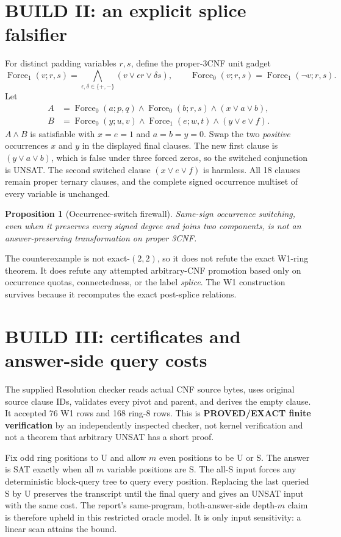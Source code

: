 \documentclass[11pt]{article}
\newtheorem{proposition}[theorem]{Proposition}
\begin{document}
\section{BUILD II: an explicit splice falsifier}
For distinct padding variables $r,s$, define the proper-3CNF unit gadget
\[
 \operatorname{Force}_1(v;r,s)=
 \bigwedge_{\epsilon,\delta\in\{+,-\}}
 (v\vee \epsilon r\vee\delta s),
 \qquad
 \operatorname{Force}_0(v;r,s)=
 \operatorname{Force}_1(\neg v;r,s).
\]
Let
\begin{align*}
 A&=\operatorname{Force}_0(a;p,q)\wedge
    \operatorname{Force}_0(b;r,s)\wedge(x\vee a\vee b),\\
 B&=\operatorname{Force}_0(y;u,v)\wedge
    \operatorname{Force}_1(e;w,t)\wedge(y\vee e\vee f).
\end{align*}
$A\wedge B$ is satisfiable with $x=e=1$ and $a=b=y=0$. Swap the two
\emph{positive} occurrences $x$ and $y$ in the displayed final clauses. The
new first clause is $(y\vee a\vee b)$, which is false under three forced
zeros, so the switched conjunction is UNSAT. The second switched clause
$(x\vee e\vee f)$ is harmless. All 18 clauses remain proper ternary
clauses, and the complete signed occurrence multiset of every variable is
unchanged.
\begin{proposition}[Occurrence-switch firewall]
Same-sign occurrence switching, even when it preserves every signed degree
and joins two components, is not an answer-preserving transformation on
proper 3CNF.
\end{proposition}
The counterexample is not exact-$(2,2)$, so it does not refute the exact
W1-ring theorem. It does refute any attempted arbitrary-CNF promotion based
only on occurrence quotas, connectedness, or the label \emph{splice}. The W1
construction survives because it recomputes the exact post-splice relations.

\section{BUILD III: certificates and answer-side query costs}
The supplied Resolution checker reads actual CNF source bytes, uses original
source clause IDs, validates every pivot and parent, and derives the empty
clause. It accepted 76 W1 rows and 168 ring-8 rows. This is
\textbf{PROVED/EXACT finite verification} by an independently inspected
checker, not kernel verification and not a theorem that arbitrary UNSAT has a
short proof.

Fix odd ring positions to U and allow $m$ even positions to be U or S. The
answer is SAT exactly when all $m$ variable positions are S. The all-S input
forces any deterministic block-query tree to query every position. Replacing
the last queried S by U preserves the transcript until the final query and
gives an UNSAT input with the same cost. The report's same-program,
both-answer-side depth-$m$ claim is therefore upheld in this restricted oracle
model. It is only input sensitivity: a linear scan attains the bound.
\end{document}
